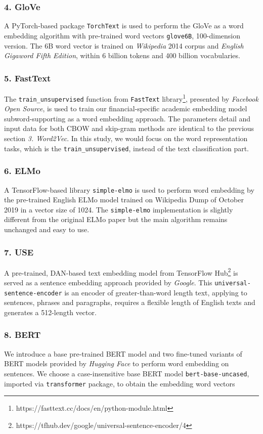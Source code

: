 \subsubsection{4. GloVe}
A PyTorch-based package \texttt{TorchText} is used to perform the GloVe as a word embedding algorithm with pre-trained word vectors \texttt{glove\.6B}, 100-dimension version.
The 6B word vector is trained on \textit{Wikipedia} 2014 corpus and \textit{English Gigaword Fifth Edition}\cite{Gigaword5}, within 6 billion tokens and 400 billion vocabularies.

\subsubsection{5. FastText}
The \texttt{train\_unsupervised} function from \texttt{FastText} library\footnote{https://fasttext.cc/docs/en/python-module.html}, presented by \textit{Facebook Open Source}, is used to train our financial-specific academic embedding model subword-supporting as a word embedding approach.
The parameters detail and input data for both CBOW and skip-gram methods are identical to the previous section \textit{3. Word2Vec}.
In this study, we would focus on the word representation tasks, which is the \texttt{train\_unsupervised}, instead of the text classification part.

\subsubsection{6. ELMo}
A TensorFlow-based library \texttt{simple-elmo} is used to perform word embedding by the pre-trained English ELMo model trained on Wikipedia Dump of October 2019 in a vector size of 1024.
The \texttt{simple-elmo} implementation is slightly different from the original ELMo paper but the main algorithm remains unchanged and easy to use.

\subsubsection{7. USE}
A pre-trained, DAN-based text embedding model from TensorFlow Hub\footnote{https://tfhub.dev/google/universal-sentence-encoder/4} is served as a sentence embedding approach provided by \textit{Google}.
This \texttt{universal-sentence-encoder} is an encoder of greater-than-word length text, applying to sentences, phrases and paragraphs, requires a flexible length of English texts and generates a 512-length vector.

\subsubsection{8. BERT}
We introduce a base pre-trained BERT model and two fine-tuned variants of BERT models provided by \textit{Hugging Face} to perform word embedding on sentences.
We choose a case-insensitive base BERT model \texttt{bert-base-uncased}, imported via \texttt{transformer} package, to obtain the embedding word vectors

